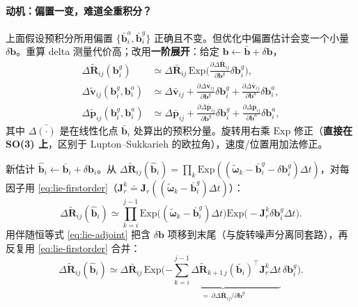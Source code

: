 \paragraph{动机：偏置一变，难道全重积分？}
上面假设预积分所用偏置 $\{\bar{\mathbf b}_i^a,\bar{\mathbf b}_i^g\}$ 正确且不变。但优化中偏置估计会变一个小量 $\delta\mathbf b$。重算 delta 测量代价高；改用\textbf{一阶展开}：给定 $\mathbf b\leftarrow\bar{\mathbf b}+\delta\mathbf b$，
\begin{equation}
\boxed{\;
\begin{aligned}
  \Delta\tilde{\mathbf R}_{ij}(\mathbf b_i^g)&\simeq\Delta\bar{\mathbf R}_{ij}\,\mathrm{Exp}\!\Big(\tfrac{\partial\Delta\bar{\mathbf R}_{ij}}{\partial\mathbf b^g}\delta\mathbf b_i^g\Big),\\
  \Delta\tilde{\mathbf v}_{ij}(\mathbf b_i^g,\mathbf b_i^a)&\simeq\Delta\bar{\mathbf v}_{ij}+\tfrac{\partial\Delta\bar{\mathbf v}_{ij}}{\partial\mathbf b^g}\delta\mathbf b_i^g+\tfrac{\partial\Delta\bar{\mathbf v}_{ij}}{\partial\mathbf b^a}\delta\mathbf b_i^a,\\
  \Delta\tilde{\mathbf p}_{ij}(\mathbf b_i^g,\mathbf b_i^a)&\simeq\Delta\bar{\mathbf p}_{ij}+\tfrac{\partial\Delta\bar{\mathbf p}_{ij}}{\partial\mathbf b^g}\delta\mathbf b_i^g+\tfrac{\partial\Delta\bar{\mathbf p}_{ij}}{\partial\mathbf b^a}\delta\mathbf b_i^a,
\end{aligned}
\;}
  \label{eq:bias-correction}
\end{equation}
其中 $\Delta\bar{(\cdot)}$ 是在线性化点 $\bar{\mathbf b}_i$ 处算出的预积分量。旋转用右乘 $\mathrm{Exp}$ 修正（\textbf{直接在 SO(3) 上}，区别于 Lupton--Sukkarieh 的欧拉角），速度/位置用加法修正。

\begin{derivation}[旋转偏置雅可比]
新估计 $\hat{\mathbf b}_i\leftarrow\bar{\mathbf b}_i+\delta\mathbf b_i$。从 $\Delta\tilde{\mathbf R}_{ij}(\hat{\mathbf b}_i)=\prod_k\mathrm{Exp}((\tilde{\boldsymbol\omega}_k-\bar{\mathbf b}_i^g-\delta\mathbf b_i^g)\Delta t)$，对每因子用 \cref{eq:lie-firstorder}（$\mathbf J_r^k\doteq\mathbf J_r((\tilde{\boldsymbol\omega}_k-\bar{\mathbf b}_i^g)\Delta t)$）：
\[
  \Delta\tilde{\mathbf R}_{ij}(\hat{\mathbf b}_i)\simeq\prod_{k=i}^{j-1}\mathrm{Exp}\big((\tilde{\boldsymbol\omega}_k-\bar{\mathbf b}_i^g)\Delta t\big)\mathrm{Exp}\big(-\mathbf J_r^k\delta\mathbf b_i^g\Delta t\big).
\]
用伴随恒等式 \cref{eq:lie-adjoint} 把含 $\delta\mathbf b$ 项移到末尾（与旋转噪声分离同套路），再反复用 \cref{eq:lie-firstorder} 合并：
\[
  \Delta\tilde{\mathbf R}_{ij}(\hat{\mathbf b}_i)\simeq\Delta\bar{\mathbf R}_{ij}\,\mathrm{Exp}\Big(\underbrace{-\sum_{k=i}^{j-1}\Delta\tilde{\mathbf R}_{k+1\,j}(\bar{\mathbf b}_i)^\top\mathbf J_r^k\Delta t}_{=\,\partial\Delta\bar{\mathbf R}_{ij}/\partial\mathbf b^g}\,\delta\mathbf b_i^g\Big).
\]
\end{derivation}

